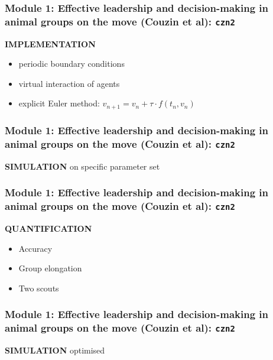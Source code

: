 \documentclass[compress]{beamer}
\begin{document}
\begin{frame}
	\frametitle{Module 1: Effective leadership and decision-making in animal groups on the move (Couzin et al): \texttt{czn2}}
	
	\textbf{IMPLEMENTATION} 
	
	\hspace{1cm}
	
	\begin{itemize}
		\item periodic boundary conditions
		\item virtual interaction of agents
		\item explicit Euler method: \( v_{n+1}= v_{n} + \tau \cdot f(t_{n}, v_{n})  \)
	\end{itemize}
	
	
\end{frame}


\begin{frame}
	\frametitle{Module 1: Effective leadership and decision-making in animal groups on the move (Couzin et al): \texttt{czn2}}
	
	\textbf{SIMULATION} on specific parameter set 
	
	
\end{frame}


\begin{frame}
	\frametitle{Module 1: Effective leadership and decision-making in animal groups on the move (Couzin et al): \texttt{czn2}}
	
	\textbf{QUANTIFICATION} 

	\hspace{1cm}
	
	\begin{itemize}
		\item Accuracy
		\item Group elongation
		\item Two scouts
	\end{itemize}
	
\end{frame}


\begin{frame}
	\frametitle{Module 1: Effective leadership and decision-making in animal groups on the move (Couzin et al): \texttt{czn2}}
	
	\textbf{SIMULATION} optimised
	
\end{frame}


%	
%	
\end{document}

